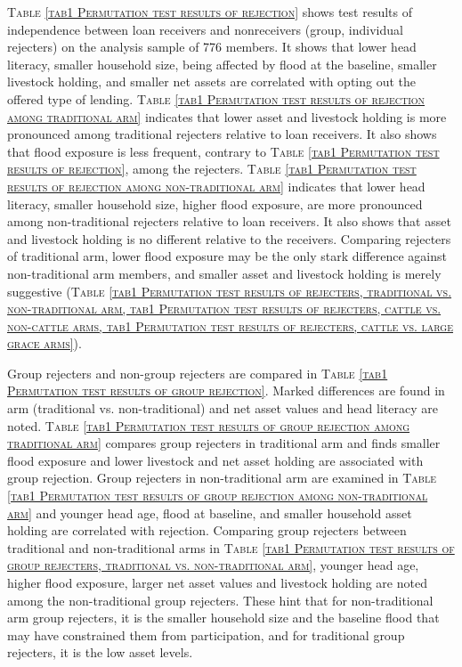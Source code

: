 	
	\textsc{\normalsize Table \ref{tab1 Permutation test results of rejection}} shows test results of independence between loan receivers and nonreceivers (group, individual rejecters) on the analysis sample of 776 members. It shows that lower head literacy, smaller household size, being affected by flood at the baseline, smaller livestock holding, and smaller net assets are correlated with opting out the offered type of lending. \textsc{\normalsize Table \ref{tab1 Permutation test results of rejection among traditional arm}} indicates that lower asset and livestock holding is more pronounced among \textsf{traditional} rejecters relative to loan receivers. It also shows that flood exposure is less frequent, contrary to \textsc{\normalsize Table \ref{tab1 Permutation test results of rejection}}, among the rejecters. \textsc{\normalsize Table \ref{tab1 Permutation test results of rejection among non-traditional arm}} indicates that lower head literacy, smaller household size, higher flood exposure, are more pronounced among non-\textsf{traditional} rejecters relative to loan receivers. It also shows that asset and livestock holding is no different relative to the receivers. Comparing rejecters of \textsf{traditional} arm, lower flood exposure may be the only stark difference against non-\textsf{traditional} arm members, and smaller asset and livestock holding is merely suggestive (\textsc{\normalsize Table \ref{tab1 Permutation test results of rejecters, traditional vs. non-traditional arm, tab1 Permutation test results of rejecters, cattle vs. non-cattle arms, tab1 Permutation test results of rejecters, cattle vs. large grace arms}}). 
	
	Group rejecters and non-group rejecters are compared in \textsc{\normalsize Table \ref{tab1 Permutation test results of group rejection}}. Marked differences are found in arm (\textsf{traditional} vs. non-\textsf{traditional}) and net asset values and head literacy are noted. \textsc{\normalsize Table \ref{tab1 Permutation test results of group rejection among traditional arm}} compares group rejecters in \textsf{traditional} arm and finds smaller flood exposure and lower livestock and net asset holding are associated with group rejection. Group rejecters in non-\textsf{traditional} arm are examined in \textsc{\normalsize Table \ref{tab1 Permutation test results of group rejection among non-traditional arm}} and younger head age, flood at baseline, and smaller household asset holding are correlated with rejection. Comparing group rejecters between \textsf{traditional} and non-\textsf{traditional} arms in \textsc{\normalsize Table \ref{tab1 Permutation test results of group rejecters, traditional vs. non-traditional arm}}, younger head age, higher flood exposure, larger net asset values and livestock holding are noted among the non-\textsf{traditional} group rejecters. These hint that for non-\textsf{traditional} arm group rejecters, it is the smaller household size and the baseline flood that may have constrained them from participation, and for \textsf{traditional} group rejecters, it is the low asset levels.

